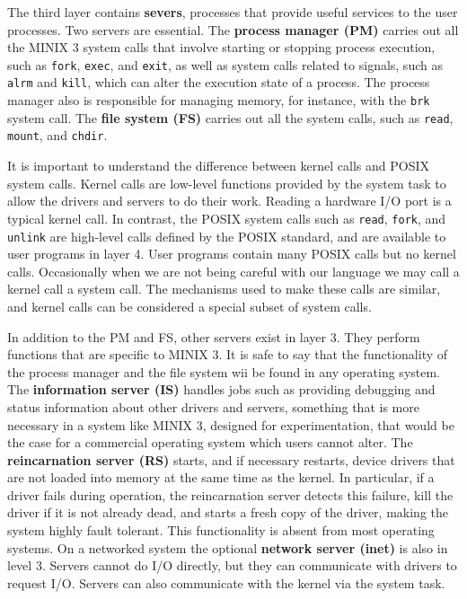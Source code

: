 \documentclass{book}
\newcommand {\kw}  [1] {\textbf{#1}}
\newcommand {\cmd} [1] {\texttt{#1}}
\begin{document}
The third layer contains \kw{severs}, processes that provide useful services to the user processes.
Two servers are essential.
The \kw{process manager (PM)} carries out all the MINIX 3 system calls that involve starting or stopping process execution,
such as \cmd{fork}, \cmd{exec}, and \cmd{exit}, as well as system calls related to signals, 
such as \cmd{alrm} and \cmd{kill}, which can alter the execution state of a process.
The process manager also is responsible for managing memory, for instance, with the \cmd{brk} system call.
The \kw{file system (FS)} carries out all the system calls, such as \cmd{read}, \cmd{mount}, and \cmd{chdir}.

It is important to understand the difference between kernel calls and POSIX system calls.
Kernel calls are low-level functions provided by the system task to allow the drivers and servers to do their work.
Reading a hardware I/O port is a typical kernel call.
In contrast, the POSIX system calls such as \cmd{read}, \cmd{fork}, and \cmd{unlink} are high-level calls defined by the POSIX standard,
and are available to user programs in layer 4.
User programs contain many POSIX calls but no kernel calls.
Occasionally when we are not being careful with our language we may call a kernel call a system call.
The mechanisms used to make these calls are similar, and kernel calls can be considered a special subset of system calls.

In addition to the PM and FS, other servers exist in layer 3.
They perform functions that are specific to MINIX 3.
It is safe to say that the functionality of the process manager and the file system wii be found in any operating system.
The \kw{information server (IS)} handles jobs such as providing debugging and status information about other drivers and servers, 
something that is more necessary in a system like MINIX 3, designed for experimentation, 
that would be the case for a commercial operating system which users cannot alter.
The \kw{reincarnation server (RS)} starts, and if necessary restarts, device drivers that are not loaded into memory at the same time as the kernel.
In particular, if a driver fails during operation, the reincarnation server detects this failure,
kill the driver if it is not already dead, and starts a fresh copy of the driver,
making the system highly fault tolerant.
This functionality is absent from most operating systems.
On a networked system the optional \kw{network server (inet)} is also in level 3.
Servers cannot do I/O directly, but they can communicate with drivers to request I/O.
Servers can also communicate with the kernel via the system task.
\end{document}
